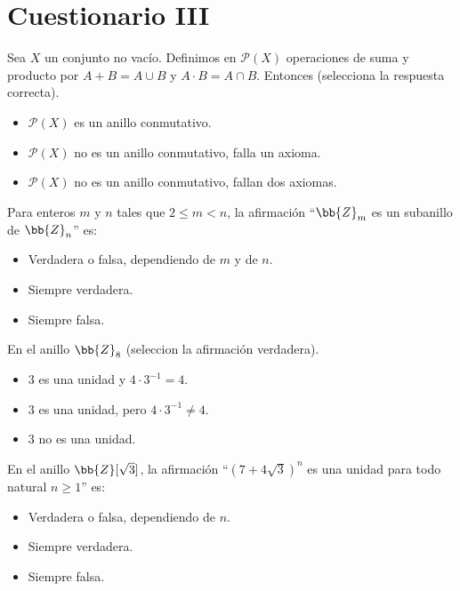 \documentclass[12pt]{article}
\newcounter{ejercicio}[section] %
\newcounter{ejercicio}
\newcommand{\resetearcontador}{%
  \setcounter{ejercicio}{0} %
}
\begin{document}
    \newpage
    \resetearcontador
    \section{Cuestionario III}
    \begin{ejercicio}
        Sea $X$ un conjunto no vacío. Definimos en $\mathcal{P}(X)$ operaciones de suma y producto por $A+B = A \cup B$ y $A \cdot B = A \cap B$. Entonces (selecciona la respuesta correcta).
        \begin{itemize}
            \item $\mathcal{P}(X)$ es un anillo conmutativo.
            \item $\mathcal{P}(X)$ no es un anillo conmutativo, falla un axioma.
            \item $\mathcal{P}(X)$ no es un anillo conmutativo, fallan dos axiomas.
        \end{itemize}
    \end{ejercicio}

    \begin{ejercicio}
        Para enteros $m$ y $n$ tales que $2 \leq m < n$, la afirmación ``$\bb{Z}_m$ es un subanillo de $\bb{Z}_n$'' es:
        \begin{itemize}
            \item Verdadera o falsa, dependiendo de $m$ y de $n$.
            \item Siempre verdadera.
            \item Siempre falsa.
        \end{itemize}
    \end{ejercicio}

    \begin{ejercicio}
        En el anillo $\bb{Z}_8$ (seleccion la afirmación verdadera).
        \begin{itemize}
            \item $3$ es una unidad y $4 \cdot 3^{-1} = 4$.
            \item $3$ es una unidad, pero $4 \cdot 3^{-1} \neq 4$.
            \item $3$ no es una unidad.
        \end{itemize}
    \end{ejercicio}

    \begin{ejercicio}
        En el anillo $\bb{Z}[\sqrt{3}]$, la afirmación ``$(7+4\sqrt{3})^n$ es una unidad para todo natural $n \geq 1$'' es:
        \begin{itemize}
            \item Verdadera o falsa, dependiendo de $n$.
            \item Siempre verdadera.
            \item Siempre falsa.
        \end{itemize}
    \end{ejercicio}
\end{document}

